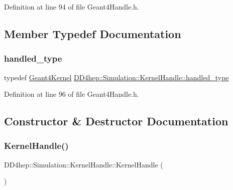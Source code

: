 Definition at line 94 of file Geant4\+Handle.\+h.



\subsection{Member Typedef Documentation}
\hypertarget{class_d_d4hep_1_1_simulation_1_1_kernel_handle_ab3846addea4978dab36bdb0cfb53dc34}{}\label{class_d_d4hep_1_1_simulation_1_1_kernel_handle_ab3846addea4978dab36bdb0cfb53dc34} 
\subsubsection{\texorpdfstring{handled\+\_\+type}{handled\_type}}
{\footnotesize\ttfamily typedef \hyperlink{class_d_d4hep_1_1_simulation_1_1_geant4_kernel}{Geant4\+Kernel} \hyperlink{class_d_d4hep_1_1_simulation_1_1_kernel_handle_ab3846addea4978dab36bdb0cfb53dc34}{D\+D4hep\+::\+Simulation\+::\+Kernel\+Handle\+::handled\+\_\+type}}



Definition at line 96 of file Geant4\+Handle.\+h.



\subsection{Constructor \& Destructor Documentation}
\hypertarget{class_d_d4hep_1_1_simulation_1_1_kernel_handle_a03e3f33ee46b60ab2daaad008ef59418}{}\label{class_d_d4hep_1_1_simulation_1_1_kernel_handle_a03e3f33ee46b60ab2daaad008ef59418} 
\subsubsection{\texorpdfstring{Kernel\+Handle()}{KernelHandle()}\hspace{0.1cm}{\footnotesize\ttfamily [1/3]}}
{\footnotesize\ttfamily D\+D4hep\+::\+Simulation\+::\+Kernel\+Handle\+::\+Kernel\+Handle (\begin{DoxyParamCaption}{ }\end{DoxyParamCaption})\hspace{0.3cm}{\ttfamily [explicit]}}




